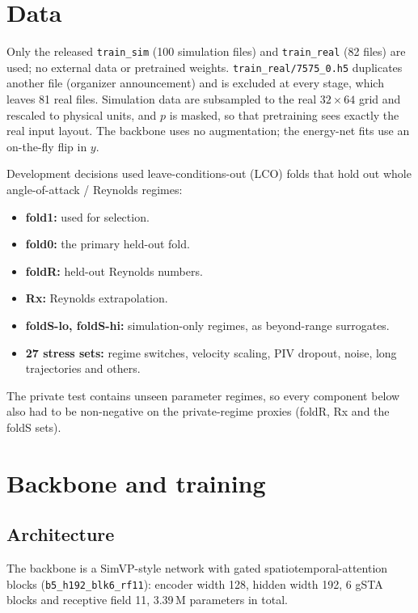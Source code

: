 \documentclass[10pt]{article}
\newcommand{\cfg}[1]{\texttt{#1}}
\begin{document}
\section{Data}

Only the released \cfg{train\_sim} (100 simulation files) and \cfg{train\_real} (82 files) are used; no
external data or pretrained weights. \cfg{train\_real/7575\_0.h5} duplicates another file (organizer
announcement) and is excluded at every stage, which leaves 81 real files. Simulation data are subsampled to
the real $32\times64$ grid and rescaled to physical units, and $p$ is masked, so that pretraining sees exactly the
real input layout. The backbone uses no augmentation; the energy-net fits use an on-the-fly flip in $y$.

Development decisions used leave-conditions-out (LCO) folds that hold out whole angle-of-attack / Reynolds
regimes:
\begin{itemize}
\item \textbf{fold1:} used for selection.
\item \textbf{fold0:} the primary held-out fold.
\item \textbf{foldR:} held-out Reynolds numbers.
\item \textbf{Rx:} Reynolds extrapolation.
\item \textbf{foldS-lo, foldS-hi:} simulation-only regimes, as beyond-range surrogates.
\item \textbf{27 stress sets:} regime switches, velocity scaling, PIV dropout, noise, long trajectories and others.
\end{itemize}
The private test contains unseen parameter regimes, so every component below also had to be non-negative on
the private-regime proxies (foldR, Rx and the foldS sets).

\section{Backbone and training}

\subsection{Architecture}
The backbone is a SimVP-style network with gated spatiotemporal-attention blocks
(\cfg{b5\_h192\_blk6\_rf11}): encoder width 128, hidden width 192, 6 gSTA blocks and receptive field 11,
3.39\,M parameters in total.
\end{document}
